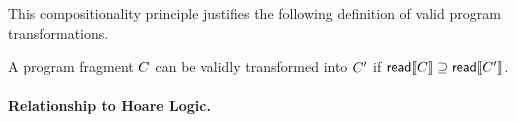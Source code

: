 This compositionality principle justifies the following definition of valid
program transformations.
\begin{definition}
  A program fragment $C$ can be validly transformed into $C'$ if
  ${\mathsf{read}}\llbracket C\rrbracket \supseteq {\mathsf{read}}\llbracket C'\rrbracket$.
\end{definition}


\paragraph{Relationship to Hoare Logic.}


